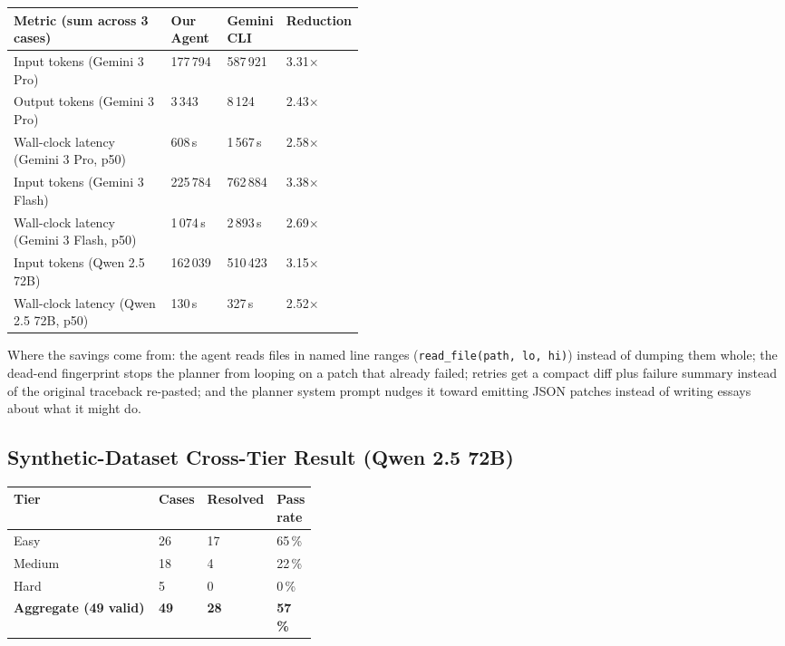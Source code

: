 \documentclass[11pt,letterpaper]{article}
\begin{document}
\begin{tabularx}{\linewidth}{X R{0.16\linewidth} R{0.16\linewidth} R{0.13\linewidth}}
\toprule
\textbf{Metric (sum across 3 cases)} & \textbf{Our Agent} & \textbf{Gemini CLI} & \textbf{Reduction} \\
\midrule
Input tokens (Gemini 3 Pro)            & 177\,794 & 587\,921 & 3.31$\times$ \\
Output tokens (Gemini 3 Pro)           &   3\,343 &   8\,124 & 2.43$\times$ \\
Wall-clock latency (Gemini 3 Pro, p50) &   608\,s & 1\,567\,s & 2.58$\times$ \\
Input tokens (Gemini 3 Flash)          & 225\,784 & 762\,884 & 3.38$\times$ \\
Wall-clock latency (Gemini 3 Flash, p50)& 1\,074\,s & 2\,893\,s & 2.69$\times$ \\
Input tokens (Qwen 2.5 72B)            & 162\,039 & 510\,423 & 3.15$\times$ \\
Wall-clock latency (Qwen 2.5 72B, p50) &   130\,s &    327\,s & 2.52$\times$ \\
\bottomrule
\end{tabularx}

Where the savings come from: the agent reads files in named line ranges (\texttt{read\_file(path, lo, hi)}) instead of dumping them whole; the dead-end fingerprint stops the planner from looping on a patch that already failed; retries get a compact diff plus failure summary instead of the original traceback re-pasted; and the planner system prompt nudges it toward emitting JSON patches instead of writing essays about what it might do.

\subsection{Synthetic-Dataset Cross-Tier Result (Qwen 2.5 72B)}

\begin{tabularx}{\linewidth}{l R{0.12\linewidth} R{0.14\linewidth} R{0.13\linewidth}}
\toprule
\textbf{Tier} & \textbf{Cases} & \textbf{Resolved} & \textbf{Pass rate} \\
\midrule
Easy   & 26 & 17 & 65\,\% \\
Medium & 18 &  4 & 22\,\% \\
Hard   &  5 &  0 &  0\,\% \\
\midrule
\textbf{Aggregate (49 valid)} & \textbf{49} & \textbf{28} & \textbf{57\,\%} \\
\bottomrule
\end{tabularx}
\end{document}
